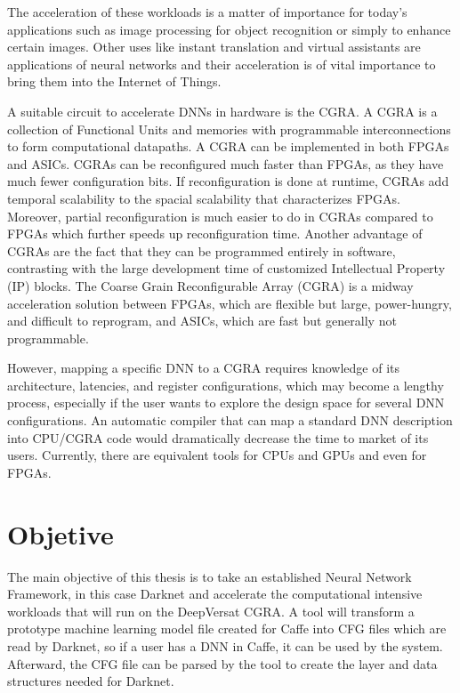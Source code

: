 The acceleration of these workloads is a matter of importance for today's
applications such as image processing for object recognition or simply to
enhance certain images. Other uses like instant translation and virtual
assistants are applications of neural networks and their acceleration is of
vital importance to bring them into the Internet of Things.

A suitable circuit to accelerate DNNs in hardware is the CGRA. A CGRA is a
collection of Functional Units and memories with programmable interconnections
to form computational datapaths. A CGRA can be implemented in both
FPGAs and ASICs. CGRAs can be reconfigured much faster than FPGAs, as they have
much fewer configuration bits. If reconfiguration is done at runtime, CGRAs add
temporal scalability to the spacial scalability that characterizes
FPGAs. Moreover, partial reconfiguration is much easier to do in CGRAs compared
to FPGAs which further speeds up reconfiguration time. Another advantage of
CGRAs are the fact that they can be programmed entirely in software, contrasting
with the large development time of customized Intellectual Property (IP) blocks.
The Coarse Grain Reconfigurable Array (CGRA) is a midway acceleration solution
between FPGAs, which are flexible but large, power-hungry, and difficult to
reprogram, and ASICs, which are fast but generally not programmable.

However, mapping a specific DNN to a CGRA requires knowledge of its
architecture, latencies, and register configurations, which may become a lengthy
process, especially if the user wants to explore the design space for several
DNN configurations. An automatic compiler that can map a standard DNN
description into CPU/CGRA code would dramatically decrease the time to market of its
users. Currently, there are equivalent tools for CPUs and GPUs and
even for FPGAs.


\section{Objetive}
\label{section:objetctive}

The main objective of this thesis is to take an established Neural Network Framework, in this case
Darknet\cite{Darknet} and accelerate the computational intensive workloads that will run on the DeepVersat CGRA. 
A tool will transform a prototype machine learning model file created for Caffe into CFG files
which are read by Darknet, so if a user has a DNN in Caffe, it can be used by the system.
Afterward, the CFG file can be parsed by the tool to create the layer and data structures
needed for Darknet.

